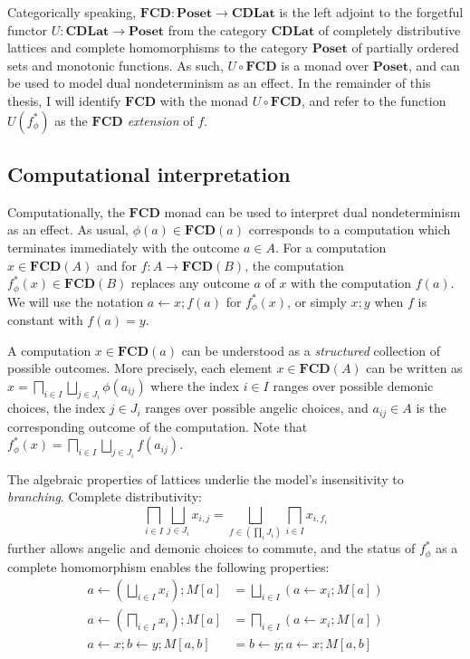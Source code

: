 \documentclass[draft,11pt]{report}
\theoremstyle{definition}
\begin{document}
Categorically speaking,
$\mathbf{FCD} : \mathbf{Poset} \rightarrow \mathbf{CDLat}$
is the left adjoint to the forgetful functor
$U : \mathbf{CDLat} \rightarrow \mathbf{Poset}$
from the category $\mathbf{CDLat}$
of completely distributive lattices and complete homomorphisms
to the category $\mathbf{Poset}$
of partially ordered sets and monotonic functions.
As such, $U \! \circ \mathbf{FCD}$ is a monad over $\mathbf{Poset}$,
and can be used to model dual nondeterminism
as an effect.
In the remainder of this thesis,
I will identify $\mathbf{FCD}$ with
the monad $U \! \circ \mathbf{FCD}$,
and refer to the function
$U(f_\phi^*)$ as the \emph{$\mathbf{FCD}$ extension} of $f$.

\subsection{Computational interpretation}

Computationally,
the $\mathbf{FCD}$ monad can be used to interpret
dual nondeterminism as an effect.
As usual,
$\phi(a) \in \mathbf{FCD}(a)$
corresponds to a computation which
terminates immediately with the outcome $a \in A$.
For a computation $x \in \mathbf{FCD}(A)$
and for $f : A \rightarrow \mathbf{FCD}(B)$,
the computation $f_\phi^*(x) \in \mathbf{FCD}(B)$
replaces
any outcome $a$ of $x$ with the computation $f(a)$.
We will use the notation
$a \leftarrow x ; f(a)$ for $f^*_\phi(x)$,
or simply $x ; y$ when $f$ is constant with $f(a) = y$.

A computation $x \in \mathbf{FCD}(a)$
can be understood as
a \emph{structured} collection of possible outcomes.
More precisely,
each element $x \in \mathbf{FCD}(A)$ can be written as
$
    x = \bigsqcap_{i \in I} \bigsqcup_{j \in J_i} \phi(a_{ij})
$
where
the index $i \in I$ ranges over possible demonic choices,
the index $j \in J_i$ ranges over possible angelic choices,
and $a_{ij} \in A$ is the corresponding outcome of the computation.
Note that
$f_\phi^*(x) = \bigsqcap_{i \in I} \bigsqcup_{j \in J_i} f(a_{ij})$.

The algebraic properties of lattices
underlie the model's insensitivity to \emph{branching}.
Complete distributivity:
\[
    \bigsqcap_{i \in I} \bigsqcup_{j \in J_i} x_{i,j} =
    \bigsqcup_{f \in (\prod_i J_i)} \bigsqcap_{i \in I} x_{i, f_i}
\]
further allows angelic and demonic choices to commute,
and the status of $f^*_\phi$ as a complete homomorphism
enables the following properties:
\begin{align*}
    a \leftarrow \left( \bigsqcup_{i \in I} x_i \right) ; M[a] &=
      \bigsqcup_{i \in I} (a \leftarrow x_i ; M[a])
    \\
    a \leftarrow \left( \bigsqcap_{i \in I} x_i \right) ; M[a] &=
      \bigsqcap_{i \in I} (a \leftarrow x_i ; M[a])
    \\
    a \leftarrow x ; b \leftarrow y ; M[a,b] &=
    b \leftarrow y ; a \leftarrow x ; M[a,b]
\end{align*}
\end{document}
